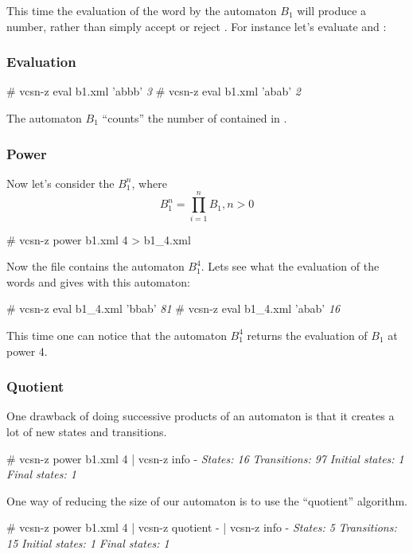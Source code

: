 This time the evaluation of the word  by the automaton $B_1$
will produce a number, rather than simply accept or reject .
For instance let's evaluate  and :

\subsubsection{Evaluation}

\begin{shell}
# vcsn-z eval b1.xml 'abbb'
\textit{3}
# vcsn-z eval b1.xml 'abab'
\textit{2}
\end{shell}

The automaton $B_1$ ``counts'' the number of  contained in
.

\subsubsection{Power}

Now let's consider the $B_1^n$, where
\begin{displaymath}
  B_1^n = \prod_{i=1}^n B_1, n > 0
\end{displaymath}

\begin{shell}
# vcsn-z power b1.xml 4 > b1_4.xml
\end{shell}

Now the file  contains the automaton $B_1^4$. Lets see
what the evaluation of the words  and  gives
with this automaton:

\begin{shell}
# vcsn-z eval b1_4.xml 'bbab'
\textit{81}
# vcsn-z eval b1_4.xml 'abab'
\textit{16}
\end{shell}

This time one can notice that the automaton $B_1^4$ returns the
evaluation of $B_1$ at power 4.

\subsubsection{Quotient}

One drawback of doing successive products of an automaton is
that it creates a lot of new states and transitions.
\begin{shell}
# vcsn-z power b1.xml 4 | vcsn-z info -
\textit{States: 16}
\textit{Transitions: 97}
\textit{Initial states: 1}
\textit{Final states: 1}
\end{shell}
One way of reducing the size of our automaton is to use the
``quotient'' algorithm.
\begin{shell}
# vcsn-z power b1.xml 4 | vcsn-z quotient - | vcsn-z info -
\textit{States: 5}
\textit{Transitions: 15}
\textit{Initial states: 1}
\textit{Final states: 1}
\end{shell}

